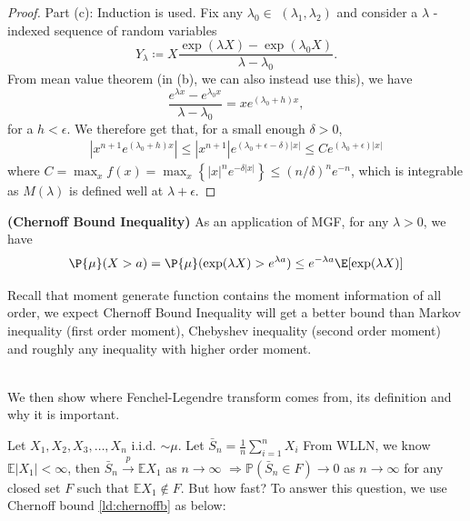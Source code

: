\documentclass{article}
\newcommand{\bfs}[1]{\textbf{({#1})}}
\begin{document}
\begin{proof}
Part (c): 
Induction is used. Fix any $\lambda_{0} \in$ $\left(\lambda_{1}, \lambda_{2}\right)$ and consider a $\lambda$ -indexed sequence of random variables
$$ 
Y_{\lambda} \coloneqq X\frac{\exp (\lambda X)-\exp \left(\lambda_{0} X\right)}{\lambda-\lambda_{0}}.
$$
From mean value theorem (in (b), we can also instead use this), we have 
$$\frac{e^{\lambda x}-e^{\lambda_{0} x}}{\lambda- \lambda_0}=x e^{(\lambda_0+h) x},$$
for a $h<\epsilon$. We therefore get that, for a small enough $\delta>0$, 
\begin{align*}
\left|x^{n+1} e^{(\lambda_0+h) x}\right| \leq\left|x^{n+1}\right| e^{(\lambda_0+\epsilon-\delta)|x|} \leq C e^{(\lambda_0+\epsilon)|x|}
\end{align*}
where $C=\max _{x} f(x)=\max _{x}\left\{|x|^{n} e^{-\delta|x|}\right\} \leq(n / \delta)^{n} e^{-n}$, which is integrable as $M(\lambda)$ is defined well at $\lambda+\epsilon$. 


\end{proof} 
\begin{lema}{\bfs{Chernoff Bound Inequality}}\label{ld:chernoffb} As an application of MGF, for any $\lambda>0$, we have
$$\P{\mu}(X>a) = \P{\mu}(\exp(\lambda X)>e^{\lambda a}) \le e^{-\lambda a}\E[\exp(\lambda X)]$$
\end{lema}
\begin{rema}
Recall that moment generate function contains the moment information of all order, we expect Chernoff Bound Inequality will get a better bound than Markov inequality (first order moment), Chebyshev inequality (second order moment) and roughly any inequality with higher order moment.

\end{rema}
\\
We then show where Fenchel-Legendre transform comes from, its definition and why it is important.

Let $X_{1}, X_{2}, X_{3}, \ldots, X_{n}$ i.i.d. $\sim \mu$. %
Let $\bar{S}_{n}=\frac{1}{n} \sum_{i=1}^{n} X_{i}$
From WLLN, we know $\mathbb{E}\left|X_{1}\right|<\infty$, then $\bar{S}_{n} \stackrel{p}{\rightarrow} \mathbb{E} X_{1}$ as $n \rightarrow \infty$
$\Rightarrow \mathbb{P}\left(\bar{S}_{n} \in F\right) \rightarrow 0$ as $n \rightarrow \infty$ for any closed set $F$ such that $\mathbb{E} X_{1} \notin F$. But how fast? To answer this question, we use Chernoff bound \cref{ld:chernoffb} as below:
\end{document}
